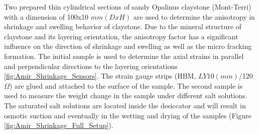 Two prepared thin cylindrical sections of sandy Opalinus claystone (Mont-Terri) with a dimension of 100x10 $mm (DxH)$ are used to determine the anisotropy in shrinkage and swelling behavior of claystone. Due to the mineral structure of claystone and its layering orientation, the anisotropy factor has a significant influence on the direction of shrinkage and swelling as well as the micro fracking formation. The initial sample is used to determine the axial strains in parallel and perpendicular directions to the layering orientations \ref{fig:Amir_Shrinkage_Sensors}. The strain gauge strips (HBM, $LY 10 (mm)$/120 $\Omega$) are glued and attached to the surface of the sample. The second sample is used to measure the weight change in the sample under different salt solutions. The saturated salt solutions are located inside the desiccator and will result in osmotic suction and eventually in the wetting and drying of the samples (Figure \ref{fig:Amir_Shrinkage_Full_Setup}). 

